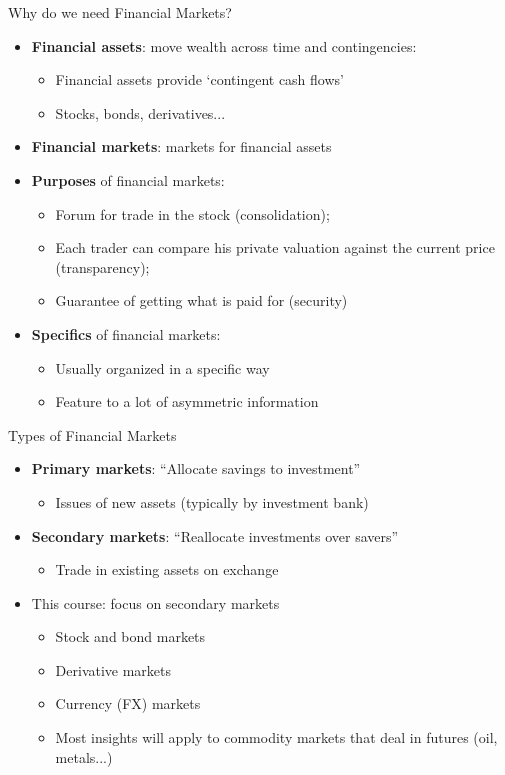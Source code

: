 \documentclass[english,10pt
,aspectratio=169
]{beamer}
\begin{document}
\begin{frame}{Why do we need Financial Markets?}
	\begin{itemize}
		\item \textbf{Financial assets}: move wealth across time and contingencies: 
		\begin{itemize}
			\item Financial assets provide `contingent cash flows'
			\item Stocks, bonds, derivatives...
		\end{itemize}
		\item \textbf{Financial markets}: markets for financial assets
		\pause
		\item \textbf{Purposes} of financial markets:
		\begin{itemize}
			\item Forum for trade in the stock (\alert{consolidation});
			\item Each trader can compare his private valuation against the current price (\alert{transparency});
			\item Guarantee of getting what is paid for (\alert{security})
		\end{itemize}
		\item \textbf{Specifics} of financial markets:
		\begin{itemize}
			\item Usually organized in a specific way
			\item Feature to a lot of asymmetric information
		\end{itemize}
	\end{itemize}
\end{frame}


\begin{frame}{Types of Financial Markets}
	\begin{itemize} 
		\item \textbf{Primary markets}: ``Allocate savings to investment''
		\begin{itemize}
			\item Issues of new assets (typically by investment bank)
		\end{itemize}
		\item \textbf{Secondary markets}: ``Reallocate investments over savers''
		\begin{itemize}
			\item Trade in existing assets on exchange
		\end{itemize}	
		\item This course: focus on secondary markets 
		\begin{itemize}
			\item Stock and bond markets
			\item Derivative markets
			\item Currency (FX) markets
			\item Most insights will apply to commodity markets that deal in futures (oil, metals...) 
		\end{itemize}
	\end{itemize}
\end{frame}
\end{document}
